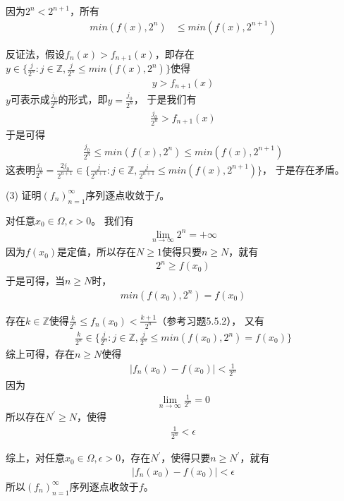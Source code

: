 \documentclass{article}
\begin{document}
因为$2^n < 2^{n + 1}$，所有
\begin{align*}
  min(f(x), 2^n) & \leq min(f(x), 2^{n + 1})
\end{align*}

反证法，假设$f_n(x) > f_{n + 1}(x)$，即存在
$y \in \{\frac{j}{2^n}: j \in \mathbb{Z}, \frac{j}{2^n} \leq min(f(x), 2^n)\}$使得
\begin{align*}
  y > f_{n + 1}(x)
\end{align*}
$y$可表示成$\frac{j_0}{2^n}$的形式，即$y = \frac{j_0}{2^n}$，
于是我们有
\begin{align*}
  \frac{j_0}{2^n} > f_{n + 1}(x)
\end{align*}
于是可得
\begin{align*}
  \frac{j_0}{2^n} \leq min(f(x), 2^n) \leq min(f(x), 2^{n + 1})
\end{align*}
这表明$\frac{j_0}{2^n} = \frac{2j_0}{2^{n + 1}} \in \{\frac{j}{2^{n + 1}}: j \in \mathbb{Z}, \frac{j}{2^{n + 1}} \leq min(f(x), 2^{n + 1})\}$，
于是存在矛盾。

(3) 证明$(f_n)_{n = 1}^\infty$序列逐点收敛于$f$。

对任意$x_0 \in \Omega, \epsilon > 0$。
我们有
\begin{align*}
  \lim\limits_{n \to \infty} 2^n = +\infty
\end{align*}
因为$f(x_0)$是定值，所以存在$N \geq 1$使得只要$n \geq N$，就有
\begin{align*}
  2^n \geq f(x_0)
\end{align*}
于是可得，当$n \geq N$时，
\begin{align*}
  min(f(x_0), 2^n) = f(x_0)
\end{align*}

存在$k \in \mathbb{Z}$使得$\frac{k}{2^n} \leq f_n(x_0) < \frac{k+1}{2^n}$（参考习题5.5.2），
又有
\begin{align*}
  \frac{k}{2^n} \in \{\frac{j}{2^n}: j \in \mathbb{Z}, \frac{j}{2^n} \leq min(f(x_0), 2^n) = f(x_0)\}
\end{align*}
综上可得，存在$n \geq N$使得
\begin{align*}
  |f_n(x_0) - f(x_0)| < \frac{1}{2^n}
\end{align*}
因为
\begin{align*}
  \lim\limits_{n \to \infty} \frac{1}{2^n} = 0
\end{align*}
所以存在$N^\prime \geq N$，使得
\begin{align*}
  \frac{1}{2^n} < \epsilon
\end{align*}

综上，对任意$x_0 \in \Omega, \epsilon > 0$，存在$N^\prime$，使得只要$n \geq N^\prime$，就有
\begin{align*}
  |f_n(x_0) - f(x_0)| < \epsilon
\end{align*}
所以$(f_n)_{n = 1}^\infty$序列逐点收敛于$f$。
\end{document}
